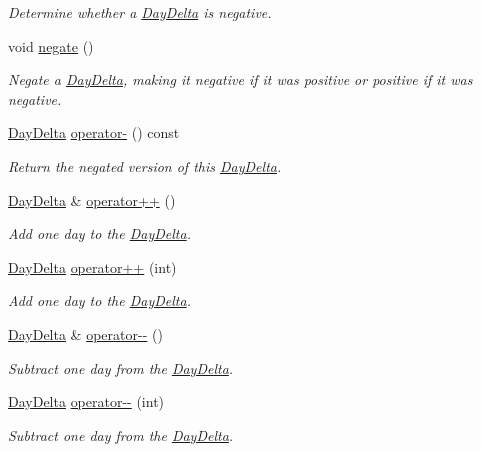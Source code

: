 \begin{DoxyCompactItemize}
\begin{DoxyCompactList}\small\item\em Determine whether a \hyperlink{structDayDelta}{Day\-Delta} is negative. \end{DoxyCompactList}\item 
void \hyperlink{structDayDelta_a23b9453556a255f5413aee21b12938a6}{negate} ()
\begin{DoxyCompactList}\small\item\em Negate a \hyperlink{structDayDelta}{Day\-Delta}, making it negative if it was positive or positive if it was negative. \end{DoxyCompactList}\item 
\hyperlink{structDayDelta}{Day\-Delta} \hyperlink{structDayDelta_ab147a13f61362001a4acdaa1b782d1cf}{operator-\/} () const 
\begin{DoxyCompactList}\small\item\em Return the negated version of this \hyperlink{structDayDelta}{Day\-Delta}. \end{DoxyCompactList}\item 
\hyperlink{structDayDelta}{Day\-Delta} \& \hyperlink{structDayDelta_aa0a78ca9d3a6a3241211e22d638e0323}{operator++} ()
\begin{DoxyCompactList}\small\item\em Add one day to the \hyperlink{structDayDelta}{Day\-Delta}. \end{DoxyCompactList}\item 
\hyperlink{structDayDelta}{Day\-Delta} \hyperlink{structDayDelta_a6f5ca65ca16018cdf39bd5543cbec127}{operator++} (int)
\begin{DoxyCompactList}\small\item\em Add one day to the \hyperlink{structDayDelta}{Day\-Delta}. \end{DoxyCompactList}\item 
\hyperlink{structDayDelta}{Day\-Delta} \& \hyperlink{structDayDelta_aa0ca3c6a73df1946150a1c7e555b79b9}{operator-\/-\/} ()
\begin{DoxyCompactList}\small\item\em Subtract one day from the \hyperlink{structDayDelta}{Day\-Delta}. \end{DoxyCompactList}\item 
\hyperlink{structDayDelta}{Day\-Delta} \hyperlink{structDayDelta_a7e0ffb0cc2aeff7414fee2edfb8e3424}{operator-\/-\/} (int)
\begin{DoxyCompactList}\small\item\em Subtract one day from the \hyperlink{structDayDelta}{Day\-Delta}. \end{DoxyCompactList}\item 

\end{DoxyCompactItemize}
